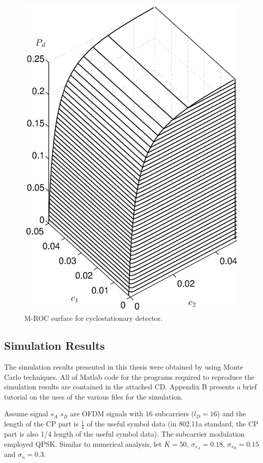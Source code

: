 \begin{figure}[!t]
  \centering 
  \includegraphics[width=12cm, height=16cm]{4/ROCsurface.eps}
  \caption{M-ROC surface for cyclostationary detector.}
  \label{pic:1221n0}
\end{figure}

\subsection{Simulation Results}
The simulation results presented in this thesis were obtained by using Monte Carlo techniques. All of Matlab code for the programs required to reproduce the simulation results are contained in the attached CD. Appendix B presents a brief tutorial on the uses of the various files for the simulation.

Assume signal $s_A$ $s_B$ are OFDM signals with $16$ subcarriers ($l_D = 16$) and the length of the CP part is $\frac{1}{4}$ of the useful symbol data (in 802.11a standard, the CP part is also 1/4 length of the useful symbol data). 
The subcarrier modulation employed QPSK. Similar to numerical analysis, let $K=50$, $\sigma_{s_A} = 0.18$, $\sigma_{s_B} = 0.15$ and $\sigma_{n} = 0.3$. 
  
